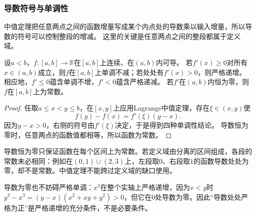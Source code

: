\subsubsection{导数符号与单调性}
中值定理把任意两点之间的函数增量写成某个内点处的导数乘以输入增量，所以导数的符号可以控制整段的增减。
这里的关键是任意两点之间的整段都属于定义域。
\begin{theorem}[导数符号与单调性]
\label{thm:analysis-derivative-monotonicity}
设$a<b$，$f:[a,b]\to\mathbb R$在$[a,b]$上连续、在$(a,b)$内可导。
若$f'(x)\geq0$对所有$x\in(a,b)$成立，则$f$在$[a,b]$上单调不减；若处处有$f'(x)>0$，则严格递增。
相应地，$f'\leq0$蕴含单调不增，$f'<0$蕴含严格递减。
若$f'$在$(a,b)$内恒为零，则$f$在$[a,b]$上为常数。
\end{theorem}
\begin{proof}
任取$a\leq x<y\leq b$，在$[x,y]$上应用Lagrange中值定理，存在$\xi\in(x,y)$使
\[
 f(y)-f(x)=f'(\xi)(y-x).
\]
因为$y-x>0$，右侧的符号由$f'(\xi)$决定，于是得到四种单调性结论。
导数恒为零时，任意两点的函数值都相等，所以函数为常数。
\end{proof}
导数恒为零只保证函数在每个区间上为常数。若定义域由分离的区间组成，各段的常数未必相同：例如在$(0,1)\cup(2,3)$上，左段取$0$、右段取$1$的函数导数处处为零，却不是常数。中值定理不能跨过定义域的缺口使用。

导数为零也不妨碍严格单调：$x^3$在整个实轴上严格递增，因为$x<y$时$y^3-x^3=(y-x)(x^2+xy+y^2)>0$，但它在$0$处导数为零。因此“导数处处严格为正”是严格递增的充分条件，不是必要条件。

